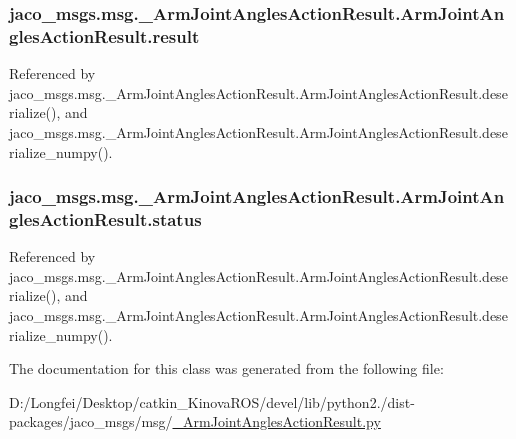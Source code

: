 \subsubsection[{\texorpdfstring{result}{result}}]{\setlength{\rightskip}{0pt plus 5cm}jaco\+\_\+msgs.\+msg.\+\_\+\+Arm\+Joint\+Angles\+Action\+Result.\+Arm\+Joint\+Angles\+Action\+Result.\+result}\hypertarget{classjaco__msgs_1_1msg_1_1__ArmJointAnglesActionResult_1_1ArmJointAnglesActionResult_a834e2d539b66918188653979cece4d81}{}\label{classjaco__msgs_1_1msg_1_1__ArmJointAnglesActionResult_1_1ArmJointAnglesActionResult_a834e2d539b66918188653979cece4d81}


Referenced by jaco\+\_\+msgs.\+msg.\+\_\+\+Arm\+Joint\+Angles\+Action\+Result.\+Arm\+Joint\+Angles\+Action\+Result.\+deserialize(), and jaco\+\_\+msgs.\+msg.\+\_\+\+Arm\+Joint\+Angles\+Action\+Result.\+Arm\+Joint\+Angles\+Action\+Result.\+deserialize\+\_\+numpy().

\subsubsection[{\texorpdfstring{status}{status}}]{\setlength{\rightskip}{0pt plus 5cm}jaco\+\_\+msgs.\+msg.\+\_\+\+Arm\+Joint\+Angles\+Action\+Result.\+Arm\+Joint\+Angles\+Action\+Result.\+status}\hypertarget{classjaco__msgs_1_1msg_1_1__ArmJointAnglesActionResult_1_1ArmJointAnglesActionResult_abc96fae35bee25ca7d43d60fb9a09cc2}{}\label{classjaco__msgs_1_1msg_1_1__ArmJointAnglesActionResult_1_1ArmJointAnglesActionResult_abc96fae35bee25ca7d43d60fb9a09cc2}


Referenced by jaco\+\_\+msgs.\+msg.\+\_\+\+Arm\+Joint\+Angles\+Action\+Result.\+Arm\+Joint\+Angles\+Action\+Result.\+deserialize(), and jaco\+\_\+msgs.\+msg.\+\_\+\+Arm\+Joint\+Angles\+Action\+Result.\+Arm\+Joint\+Angles\+Action\+Result.\+deserialize\+\_\+numpy().



The documentation for this class was generated from the following file\+:\begin{DoxyCompactItemize}
\item 
D\+:/\+Longfei/\+Desktop/catkin\+\_\+\+Kinova\+R\+O\+S/devel/lib/python2./dist-\/packages/jaco\+\_\+msgs/msg/\hyperlink{__ArmJointAnglesActionResult_8py}{\+\_\+\+Arm\+Joint\+Angles\+Action\+Result.\+py}\end{DoxyCompactItemize}
